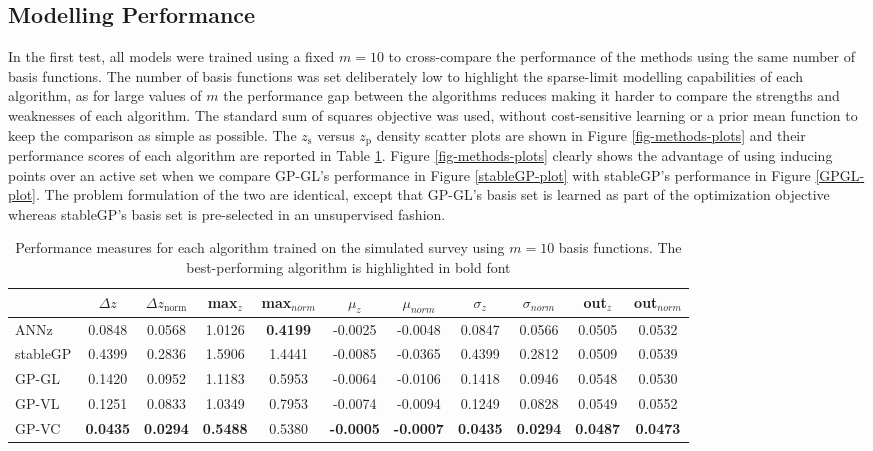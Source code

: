 \documentclass[useAMS,usenatbib,fleqn]{mn2e}
\begin{document}
\subsection{Modelling Performance}

In the first test, all models were trained using a fixed $m=10$ to cross-compare the performance of the methods using the same number of basis functions. The number of basis functions was set deliberately low to highlight the sparse-limit modelling capabilities of each algorithm, as for large values of $m$ the performance gap between the algorithms reduces making it harder to compare the strengths and weaknesses of each algorithm. The standard sum of squares objective was used, without cost-sensitive learning or a prior mean function to keep the comparison as simple as possible. The $z_\textrm{s}$ versus $z_\textrm{p}$ density scatter plots are shown in Figure \ref{fig-methods-plots} and their performance scores of each algorithm are reported in Table \ref{table-10-basis}. Figure \ref{fig-methods-plots} clearly shows the advantage of using inducing points over an active set when we compare GP-GL's performance in Figure \ref{stableGP-plot} with {\sc stableGP}'s performance in Figure \ref{GPGL-plot}. The problem formulation of the two are identical, except that GP-GL's basis set is learned as part of the optimization objective whereas {\sc stableGP}'s basis set is pre-selected in an unsupervised fashion.

 \begin{table}
\caption{Performance measures for each algorithm trained on the simulated survey using $m=10$ basis functions. The best-performing algorithm is highlighted in bold font}
\begin{center}
\begin{tabular}{| l | c | c |  c | c |  c | c |  c | c |  c | c | }
     				&	$\Delta z$	&	$\Delta z_\textrm{norm}$	&	max$_{z}$ & max$_{norm}$		&	$\mu_{z}$&	$\mu_{norm}$	& $\sigma_{z}$ & $\sigma_{norm}$ & out$_{z}$&out$_{norm}$\\	\hline
	{\sc ANNz}	&	0.0848		&	0.0568	&	1.0126			&	\textbf{0.4199}&	-0.0025			&	-0.0048&	0.0847		&	0.0566&	0.0505		&	0.0532	\\
	{\sc stableGP}	&	0.4399		&	0.2836	&	1.5906			&	1.4441&	-0.0085			&	-0.0365&	0.4399		&	0.2812&	0.0509		&	0.0539	\\
	GP-GL		&	0.1420		&	0.0952	&	1.1183			&	0.5953&	-0.0064			&	-0.0106&	0.1418		&	0.0946&	0.0548		&	0.0530	\\
	GP-VL		&	0.1251	&	0.0833	&	1.0349			&	0.7953&	-0.0074			&	-0.0094&	0.1249		&	0.0828&	0.0549		&	0.0552	\\
	GP-VC	&	\textbf{0.0435}	&	\textbf{0.0294}	 &	\textbf{0.5488	}		&	0.5380 &	\textbf{-0.0005}			&	\textbf{-0.0007}&	\textbf{0.0435	}	&	\textbf{0.0294} &	\textbf{0.0487}		&	\textbf{0.0473}	 \\\hline
  \end{tabular}
\end{center}
\label{table-10-basis}
\end{table}
\end{document}
